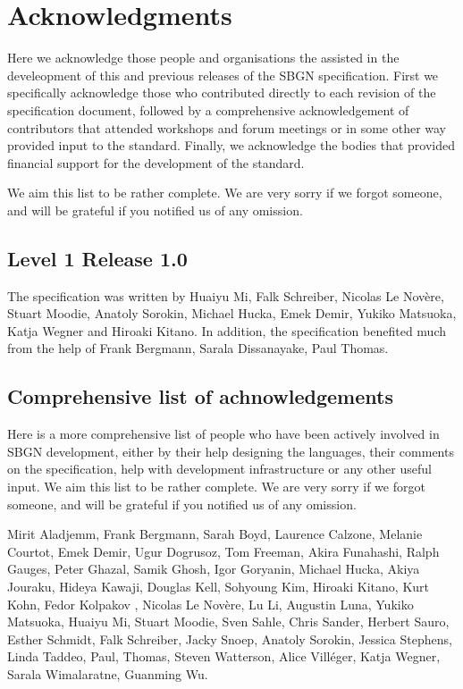 \chapter{Acknowledgments}\label{sec:acknowledgments}

Here we acknowledge those people and organisations the assisted in the develeopment of this and previous releases of the SBGN \AFl specification. First we specifically acknowledge those who contributed directly to each revision of the  specification document, followed by a comprehensive acknowledgement of contributors that attended workshops and forum meetings or in some other way provided input to the standard. Finally, we acknowledge the bodies that provided financial support for the development of the standard.


 We aim this list to be rather complete. We are very sorry if we forgot someone, and will be grateful if you notified us of any omission.

\section{Level 1 Release 1.0}

The specification was written by Huaiyu Mi, Falk Schreiber, Nicolas Le Nov\`{e}re, 
Stuart Moodie, Anatoly Sorokin, Michael Hucka, Emek Demir, Yukiko Matsuoka, Katja Wegner and Hiroaki Kitano. In addition, the specification benefited much from the help of Frank Bergmann, Sarala Dissanayake, Paul Thomas.

\section{Comprehensive list of achnowledgements}

Here is a more comprehensive list of people who have been actively involved 
in SBGN development, either by their help designing the languages, their 
comments on the specification, help with development infrastructure or any 
other useful input.  We aim this list to be rather complete. We are very 
sorry if we forgot someone, and will be grateful if you notified us of any 
omission.

Mirit Aladjemm, Frank Bergmann, Sarah Boyd, Laurence Calzone, Melanie 
Courtot, Emek Demir, Ugur Dogrusoz, Tom Freeman, Akira Funahashi, Ralph 
Gauges, Peter Ghazal, Samik Ghosh, Igor Goryanin, Michael Hucka, Akiya 
Jouraku, Hideya Kawaji, Douglas Kell, Sohyoung Kim, Hiroaki Kitano, Kurt 
Kohn, Fedor Kolpakov , Nicolas Le Nov\`{e}re, Lu Li, Augustin Luna, Yukiko 
Matsuoka, Huaiyu Mi, Stuart Moodie, Sven Sahle, Chris Sander, Herbert 
Sauro, Esther Schmidt, Falk Schreiber, Jacky Snoep, Anatoly Sorokin, 
Jessica Stephens, Linda Taddeo, Paul, Thomas, Steven Watterson, Alice Vill\'{e}ger, Katja 
Wegner, Sarala Wimalaratne, Guanming Wu.

